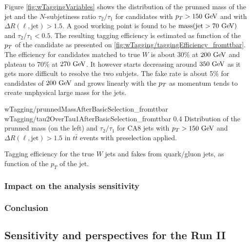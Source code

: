             Figure \ref{fig:wTaggingVariables} shows the distribution of the prunned mass of
            the jet and the $N$-subjetiness ratio $\tau_2 / \tau_1$ for candidates with
            $p_T > 150~\text{GeV}$ and with $\Delta R(\ell,\text{jet}) > 1.5$. A good working point
            is found to be $\text{mass}(\text{jet} > 70~\text{GeV})$ and $\tau_2 / \tau_1 < 0.5$.
            The resulting tagging efficiency is estimated as function of the $p_T$ of the
            candidate as presented on \ref{fig:wTagging/taggingEfficiency_fromttbar}. 
            The efficiency for candidates matched
            to true $W$ is about 30\% at $200~\text{GeV}$ and plateau to 70\% at $270~\text{GeV}$. It
            however starts decreasing around $350~\text{GeV}$ as it gets more difficult to resolve
            the two subjets. The fake rate is about 5\% for candidates of $200~\text{GeV}$ and
            grows linearly with the $p_T$ as momentum tends to create unphysical large
            mass for the jets.

                             {wTagging/prunnedMassAfterBasicSelection_fromttbar}
                             {wTagging/tau2OverTau1AfterBasicSelection_fromttbar}
                             {0.4}
                             {Distribution of the prunned mass (on the left) and $\tau_2 
                             / \tau_1$ for CA8 jets with $p_T > 150~\text{GeV}$ and 
                             $\Delta R(\ell,\text{jet}) > 1.5$ in $t\bar{t}$ events
                             with preselection applied.}

                         {Tagging efficiency for the true $W$ jets and fakes from quark/gluon
                         jets, as function of the $p_T$ of the jet.}

            \subsubsection{Impact on the analysis sensitivity}
            
            \subsubsection{Conclusion}
        
        \subsection{Sensitivity and perspectives for the Run II}
        
